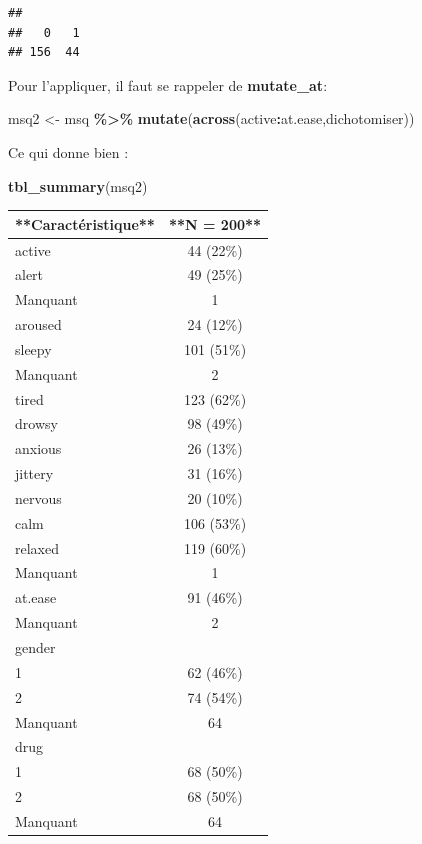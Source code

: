 \documentclass[
]{book}
\newenvironment{Shaded}{\begin{snugshade}}{\end{snugshade}}
\newcommand{\FunctionTok}[1]{\textcolor[rgb]{0.13,0.29,0.53}{\textbf{#1}}}
\newcommand{\NormalTok}[1]{#1}
\newcommand{\OtherTok}[1]{\textcolor[rgb]{0.56,0.35,0.01}{#1}}
\newcommand{\SpecialCharTok}[1]{\textcolor[rgb]{0.81,0.36,0.00}{\textbf{#1}}}
\begin{document}
\begin{verbatim}
## 
##   0   1 
## 156  44
\end{verbatim}

Pour l'appliquer, il faut se rappeler de \textbf{mutate\_at}:

\begin{Shaded}
\begin{Highlighting}[]
\NormalTok{msq2 }\OtherTok{\textless{}{-}}\NormalTok{ msq }\SpecialCharTok{\%\textgreater{}\%} \FunctionTok{mutate}\NormalTok{(}\FunctionTok{across}\NormalTok{(active}\SpecialCharTok{:}\NormalTok{at.ease,dichotomiser))}
\end{Highlighting}
\end{Shaded}

Ce qui donne bien :

\begin{Shaded}
\begin{Highlighting}[]
\FunctionTok{tbl\_summary}\NormalTok{(msq2)}
\end{Highlighting}
\end{Shaded}

\begin{tabular}{l|c}
\hline
**Caractéristique** & **N = 200**\\
\hline
active & 44 (22\%)\\
\hline
alert & 49 (25\%)\\
\hline
Manquant & 1\\
\hline
aroused & 24 (12\%)\\
\hline
sleepy & 101 (51\%)\\
\hline
Manquant & 2\\
\hline
tired & 123 (62\%)\\
\hline
drowsy & 98 (49\%)\\
\hline
anxious & 26 (13\%)\\
\hline
jittery & 31 (16\%)\\
\hline
nervous & 20 (10\%)\\
\hline
calm & 106 (53\%)\\
\hline
relaxed & 119 (60\%)\\
\hline
Manquant & 1\\
\hline
at.ease & 91 (46\%)\\
\hline
Manquant & 2\\
\hline
gender & \\
\hline
1 & 62 (46\%)\\
\hline
2 & 74 (54\%)\\
\hline
Manquant & 64\\
\hline
drug & \\
\hline
1 & 68 (50\%)\\
\hline
2 & 68 (50\%)\\
\hline
Manquant & 64\\
\hline
\end{tabular}
\end{document}
